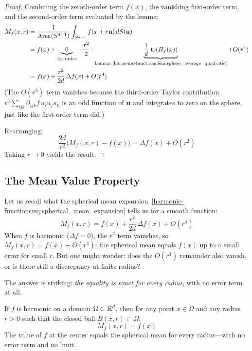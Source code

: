 \begin{notechapter}
\begin{proof}
Combining the zeroth-order term $f(x)$, the vanishing first-order term, and
the second-order term evaluated by the lemma:
\begin{align}
M_f(x,r)
&= \frac{1}{\operatorname{Area}(S^{d-1})} \int_{S^{d-1}}
   f(x + r\mathbf{u})\,dS(\mathbf{u}) \\
&= f(x) + \underbrace{0}_{\text{1st order}}
   + \frac{r^2}{2}\cdot
   \underbrace{\frac{1}{d}\,\operatorname{tr}(H_f(x))}_{\text{Lemma~\ref{harmonic-functions:lem:sphere_average_quadratic}}}
   + O(r^4) \\
&= f(x) + \frac{r^2}{2d}\,\Delta f(x) + O(r^4)
\end{align}
(The $O(r^3)$ term vanishes because the third-order Taylor contribution
$r^3 \sum_{ijk} \partial_{ijk}f\, u_i u_j u_k$ is an odd function of
$\mathbf{u}$ and integrates to zero on the sphere, just like the first-order
term did.)

Rearranging:
\[
\frac{2d}{r^2}\bigl(M_f(x,r) - f(x)\bigr)
= \Delta f(x) + O(r^2)
\]
Taking $r \to 0$ yields the result.
\end{proof}

\subsection{The Mean Value Property}

Let us recall what the spherical mean expansion~\eqref{harmonic-functions:eq:spherical_mean_expansion} tells us for a smooth function:
\[
M_f(x,r) = f(x) + \frac{r^2}{2d}\,\Delta f(x) + O(r^4)
\]
When $f$ is harmonic ($\Delta f = 0$), the $r^2$ term vanishes, so
$M_f(x,r) = f(x) + O(r^4)$: the spherical mean equals $f(x)$ up to a
small error for small $r$. But one might wonder: does the $O(r^4)$
remainder also vanish, or is there still a discrepancy at finite radius?

The answer is striking: \emph{the equality is exact for every radius}, with
no error term at all.

\begin{theorem}
\label{harmonic-functions:thm:mean_value}
If $f$ is harmonic on a domain $\Omega \subset \mathbb{R}^d$, then for any point
$x \in \Omega$ and any radius $r > 0$ such that the closed ball
$\overline{B(x,r)} \subset \Omega$:
\begin{equation}
M_f(x,r) = f(x)
\end{equation}
The value of $f$ at the center equals the spherical mean for every
radius---with no error term and no limit.
\end{theorem}


\end{notechapter}
